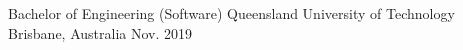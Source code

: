 

\begin{cventries}

  \cventry
    {Bachelor of Engineering (Software)} %
    {Queensland University of Technology} %
    {Brisbane, Australia} %
    {Nov. 2019} %
    {}


\end{cventries}
